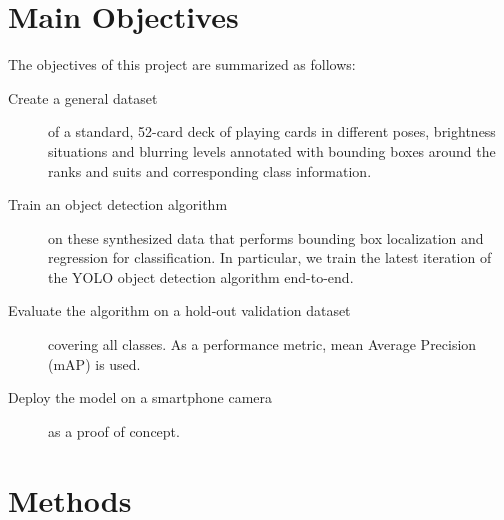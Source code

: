 \documentclass[a0,landscape]{a0poster}
\begin{document}
\begin{multicols}{3}

\color{DarkSlateGray} %

\section*{Main Objectives}
The objectives of this project are summarized as follows:

\begin{description}

\item[Create a general dataset] of a standard, 52-card deck of playing cards  in different poses, brightness situations and blurring levels annotated with bounding boxes around the ranks and suits and corresponding class information.
\item[Train an object detection algorithm] on these synthesized data that performs bounding box localization and regression for classification. In particular, we train  the latest iteration of the YOLO object detection algorithm \cite{DBLP:journals/corr/abs-1804-02767} end-to-end.
\item[Evaluate the algorithm on a hold-out validation dataset] covering all classes. As a performance metric, mean Average Precision (mAP) is used.
\item[Deploy the model on a smartphone camera] as a proof of concept.

\end{description}



\section*{Methods}

\end{multicols}
\end{document}
